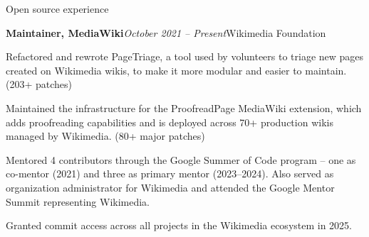 \documentclass{resume} %
\begin{document}
\begin{rSection}{Open source experience}
\begin{rSubsection}{\bf Maintainer, MediaWiki}{\em October 2021 -- Present}{Wikimedia Foundation}{}
\item Refactored and rewrote PageTriage, a tool used by volunteers to triage new pages created on Wikimedia wikis, to make it more modular and easier to maintain. (203+ patches)
\item Maintained the infrastructure for the ProofreadPage MediaWiki extension, which adds proofreading capabilities and is deployed across 70+ production wikis managed by Wikimedia. (80+ major patches)
\item Mentored 4 contributors through the Google Summer of Code program -- one as co-mentor (2021) and three as primary mentor (2023--2024). Also served as organization administrator for Wikimedia and attended the Google Mentor Summit representing Wikimedia.
\item Granted commit access across all projects in the Wikimedia ecosystem in 2025.
\end{rSubsection}

\end{rSection}
\end{document}

